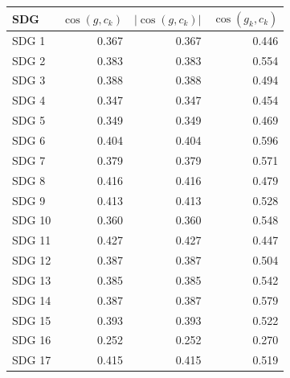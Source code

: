 \begin{tabular}{lrrr}
\toprule
SDG & $\cos(g, c_k)$ & $|\cos(g, c_k)|$ & $\cos(g_k, c_k)$ \\
\midrule
SDG 1 & 0.367 & 0.367 & 0.446 \\
SDG 2 & 0.383 & 0.383 & 0.554 \\
SDG 3 & 0.388 & 0.388 & 0.494 \\
SDG 4 & 0.347 & 0.347 & 0.454 \\
SDG 5 & 0.349 & 0.349 & 0.469 \\
SDG 6 & 0.404 & 0.404 & 0.596 \\
SDG 7 & 0.379 & 0.379 & 0.571 \\
SDG 8 & 0.416 & 0.416 & 0.479 \\
SDG 9 & 0.413 & 0.413 & 0.528 \\
SDG 10 & 0.360 & 0.360 & 0.548 \\
SDG 11 & 0.427 & 0.427 & 0.447 \\
SDG 12 & 0.387 & 0.387 & 0.504 \\
SDG 13 & 0.385 & 0.385 & 0.542 \\
SDG 14 & 0.387 & 0.387 & 0.579 \\
SDG 15 & 0.393 & 0.393 & 0.522 \\
SDG 16 & 0.252 & 0.252 & 0.270 \\
SDG 17 & 0.415 & 0.415 & 0.519 \\
\bottomrule
\end{tabular}
